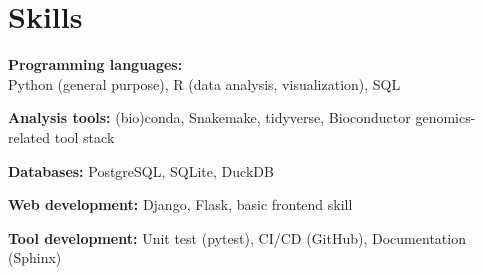 \section{Skills}

\begin{entrylist}

\item \textbf{Programming languages:}\\
    Python (general purpose),
    R (data analysis, visualization),
    SQL

\item \textbf{Analysis tools:} (bio)conda, Snakemake, tidyverse, Bioconductor genomics-related tool stack

\item \textbf{Databases:} PostgreSQL, SQLite, DuckDB

\item \textbf{Web development:} Django, Flask, basic front\-end skill

\item \textbf{Tool development:} Unit test (pytest), CI/CD (GitHub), Documentation (Sphinx)

\end{entrylist}
